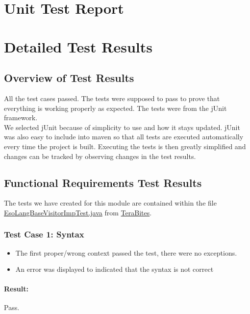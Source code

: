 \documentclass[english]{article}
\begin{document}
		\newpage
		\section*{Unit Test Report}

		\section{Detailed Test Results}
		\subsection{Overview of Test Results}

All the test cases passed. The tests were supposed to pass to prove that everything is working properly as expected. The tests were from the jUnit framework.\\

We selected jUnit because of simplicity to use and how it stays updated. jUnit was also easy to include into maven so that all tests are executed automatically every time the project is built. Executing the tests is then greatly simplified and changes can be tracked by observing changes in the test results.
		\subsection{Functional Requirements Test Results}
		The tests we have created for this module are contained within the file \href{https://github.com/Dzilafho/TeraBites/tree/master/Arcane%20Arcade%20Integrated/ArcaneArcade/src/test/java/com/mycompany/arcane/EsoLangBaseVisitorImpTest.java}{EsoLangBaseVisitorImpTest.java} from \href{https://github.com/Dzilafho/TeraBites}{TeraBites}.
		
			\subsubsection{Test Case 1: Syntax}
			\begin{itemize}
			\item The first proper/wrong context passed the test, there were no exceptions.\\
			
			\item An error was displayed to indicated that the syntax is not correct\\
			\end{itemize}
						\paragraph{Result: } Pass.
\end{document}
